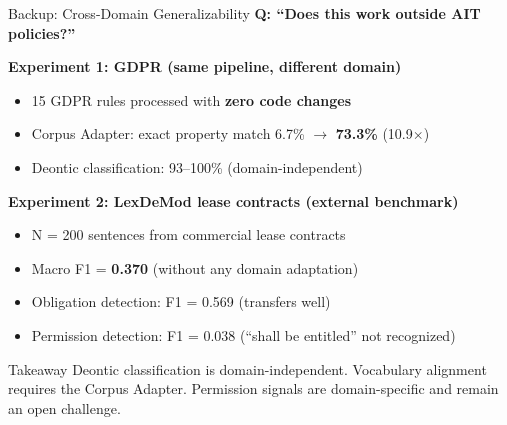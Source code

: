 \documentclass[aspectratio=169, 10pt]{beamer}
\begin{document}
\begin{frame}{Backup: Cross-Domain Generalizability}
    \textbf{Q: ``Does this work outside AIT policies?''}

    \vspace{0.2cm}
    \textbf{Experiment 1: GDPR (same pipeline, different domain)}
    \begin{itemize}
        \item 15 GDPR rules processed with \textbf{zero code changes}
        \item Corpus Adapter: exact property match 6.7\% $\rightarrow$ \textbf{73.3\%} (10.9$\times$)
        \item Deontic classification: 93--100\% (domain-independent)
    \end{itemize}

    \vspace{0.3cm}
    \textbf{Experiment 2: LexDeMod lease contracts (external benchmark)}
    \begin{itemize}
        \item N = 200 sentences from commercial lease contracts
        \item Macro F1 = \textbf{0.370} (without any domain adaptation)
        \item Obligation detection: F1 = 0.569 (transfers well)
        \item Permission detection: F1 = 0.038 (``shall be entitled'' not recognized)
    \end{itemize}

    \vspace{0.3cm}
    \begin{exampleblock}{Takeaway}
        Deontic classification is domain-independent. Vocabulary alignment requires the Corpus Adapter. Permission signals are domain-specific and remain an open challenge.
    \end{exampleblock}
\end{frame}
\end{document}
